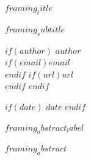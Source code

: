 \documentclass[11pt]{article}
\begin{document}
\thispagestyle{empty}
\vspace*{0.1in}

\begin{center}

{\Huge \textbf{$framing_title$}}

\vspace{0.3in}


\vspace{0.20in}

{\Large \textit{$framing_subtitle$}}

\vspace{0.20in}


$if(author)$
\vspace{0.22in}
{\large $author$}\\
$if(email)$\href{mailto:$email$}{$email$}\\$endif$
$if(url)$\href{$url$}{$url$}\\$endif$
$endif$

$if(date)$
\vspace{0.05in}
{\normalsize $date$}
$endif$

\end{center}

\vspace*{\fill}

\newpage

\thispagestyle{empty}
\hypertarget{$framing_abstract_anchor$}{}\label{$framing_abstract_anchor$}
\vspace*{0.15in}

\begin{center}
{\Large \headingfont\bfseries\color{headingcolor} $framing_abstract_label$}
\end{center}

\vspace{0.2in}

\begingroup
\large
{}
\setlength{\parskip}{1.2em}
\setlength{\parindent}{0pt}
$framing_abstract$
\endgroup
\end{document}
